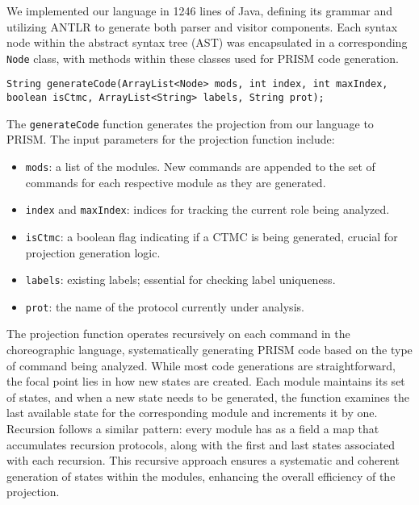We implemented our language in 1246 lines of Java, defining its grammar and utilizing ANTLR \cite{ANTLR} to generate both parser and visitor components. Each syntax node within the abstract syntax tree (AST) was encapsulated in a corresponding {\tt Node} class, with methods within these classes used for PRISM code generation.
\begin{lstlisting}[language=Eclipse,caption=The \texttt{generateCode} function.,label=genfun1,numbers=none]
	String generateCode(ArrayList<Node> mods, int index, int maxIndex, boolean isCtmc, ArrayList<String> labels, String prot);	
\end{lstlisting}
The {\tt generateCode} function generates the projection from our language to PRISM.
The input parameters for the projection function include:
\begin{itemize}
\item \texttt{mods}: a list of the modules.  New commands are appended to the set of commands for each respective module as they are generated.
\item \texttt{index} and \texttt{maxIndex}: indices for tracking the current role being analyzed.
\item \texttt{isCtmc}: a boolean flag indicating if a CTMC is being generated, crucial for projection generation logic.
\item \texttt{labels}: existing labels; essential for checking label uniqueness.
\item \texttt{prot}: the name of the protocol currently under analysis.
\end{itemize}
The projection function operates recursively on each command in the choreographic language, systematically generating PRISM code based on the type of command being analyzed. While most code generations are straightforward, the focal point lies in how new states are created. Each module maintains its set of states, and when a new state needs to be generated, the function examines the last available state for the corresponding module and increments it by one.
Recursion follows a similar pattern: every module has as a field a map that accumulates recursion protocols, along with the first and last states associated with each recursion. This recursive approach ensures a systematic and coherent generation of states within the modules, enhancing the overall efficiency of the projection.

